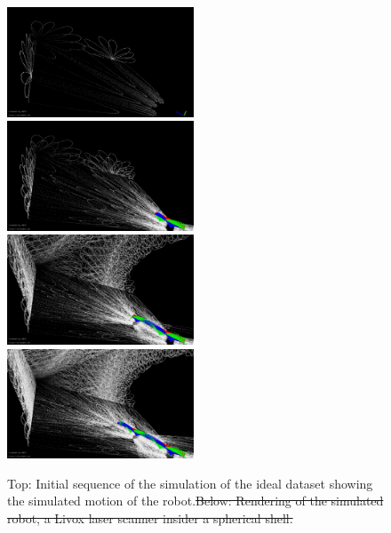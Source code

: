 \documentclass[5p]{elsarticle}
\providecommand{\DIFdeltex}[1]{{\protect\color{red}\sout{#1}}}                      %
\providecommand{\DIFdelFL}[1]{\DIFdel{#1}} %
\providecommand{\DIFdelbeginFL}{} %
\providecommand{\DIFdelendFL}{} %
\providecommand{\DIFdel}[1]{\texorpdfstring{\DIFdeltex{#1}}{}} %
\begin{document}
\begin{figure}
	\centering
	\includegraphics[width=0.495\textwidth]{images/sim_frame_00.png}\hfill
	\includegraphics[width=0.495\textwidth]{images/sim_frame_02.png}\\
	\includegraphics[width=0.495\textwidth]{images/sim_frame_06.png}\hfill
	\includegraphics[width=0.495\textwidth]{images/sim_frame_08.png}\\
	\DIFdelbeginFL %
\DIFdelendFL \caption{Top: Initial sequence of the simulation of the ideal dataset showing the simulated motion of the robot.\DIFdelbeginFL \DIFdelFL{Below: Rendering of the simulated robot, a Livox laser scanner insider a spherical shell.}\DIFdelendFL }
	\label{fig:robotRender}
\end{figure}
\end{document}
